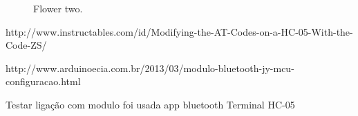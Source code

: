 \begin{figure}[h]
\begin{minipage}[b]{0.4\textwidth}
		\caption{Flower two.}
	\end{minipage}
\end{figure}


http://www.instructables.com/id/Modifying-the-AT-Codes-on-a-HC-05-With-the-Code-ZS/


http://www.arduinoecia.com.br/2013/03/modulo-bluetooth-jy-mcu-configuracao.html


Testar ligação com modulo foi usada app bluetooth Terminal HC-05









